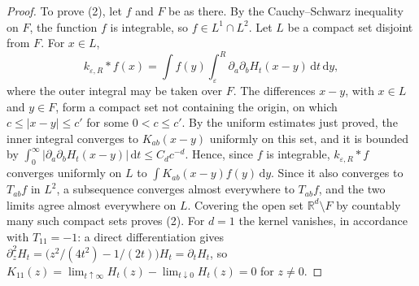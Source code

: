 \begin{proof}
To prove (2), let $f$ and $F$ be as there. By the Cauchy--Schwarz inequality on $F$, the function $f$ is integrable, so $f\in L^1\cap L^2$. Let $L$ be a compact set disjoint from $F$. For $x\in L$,
\[
 k_{\varepsilon,R}*f(x)=\int f(y)\int_\varepsilon^R\partial_a\partial_bH_t(x-y)\,\mathrm d t\,\mathrm d y,
\]
where the outer integral may be taken over $F$. The differences $x-y$, with $x\in L$ and $y\in F$, form a compact set not containing the origin, on which $c\leq|x-y|\leq c'$ for some $0<c\leq c'$. By the uniform estimates just proved, the inner integral converges to $K_{ab}(x-y)$ uniformly on this set, and it is bounded by $\int_0^\infty|\partial_a\partial_bH_t(x-y)|\,\mathrm d t\leq C_dc^{-d}$. Hence, since $f$ is integrable, $k_{\varepsilon,R}*f$ converges uniformly on $L$ to $\int K_{ab}(x-y)f(y)\,\mathrm d y$. Since it also converges to $T_{ab}f$ in $L^2$, a subsequence converges almost everywhere to $T_{ab}f$, and the two limits agree almost everywhere on $L$. Covering the open set $\mathbb R^d\setminus F$ by countably many such compact sets proves (2). For $d=1$ the kernel vanishes, in accordance with $T_{11}=-1$: a direct differentiation gives $\partial_z^2H_t=\bigl(z^2/(4t^2)-1/(2t)\bigr)H_t=\partial_tH_t$, so $K_{11}(z)=\lim_{t\uparrow\infty}H_t(z)-\lim_{t\downarrow0}H_t(z)=0$ for $z\neq0$.
\end{proof}

